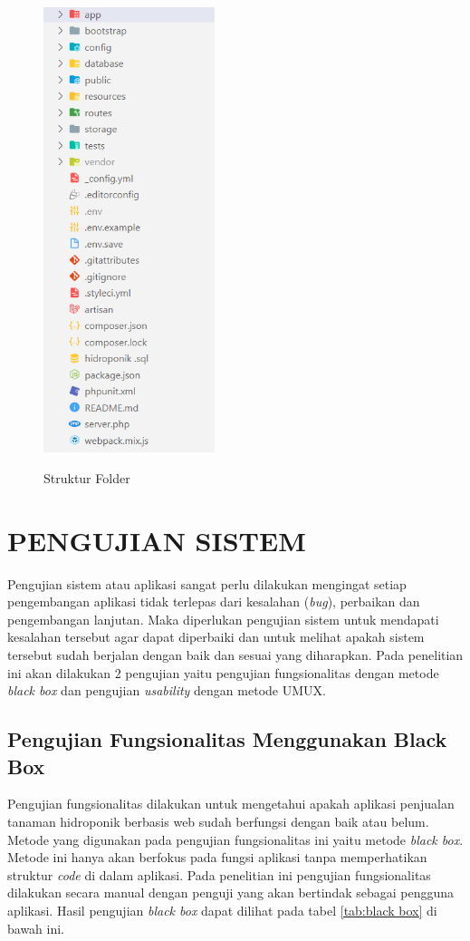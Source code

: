 \begin{enumerate}
	\begin{figure}[H]
		\centering
		{\includegraphics [width = 5cm, height= 13cm]{gambar/struktur folder}}
		\caption{Struktur Folder}
		\label{struktur folder}
	\end{figure}
\end{enumerate}

\section{\uppercase{Pengujian Sistem}}
Pengujian sistem atau aplikasi sangat perlu dilakukan mengingat setiap pengembangan aplikasi tidak terlepas dari kesalahan (\textit{bug}), perbaikan dan pengembangan lanjutan. Maka diperlukan pengujian sistem untuk mendapati kesalahan tersebut agar dapat diperbaiki dan untuk melihat apakah sistem tersebut sudah berjalan dengan baik dan sesuai yang diharapkan. Pada penelitian ini akan dilakukan 2 pengujian yaitu pengujian fungsionalitas dengan metode \textit{black box} dan pengujian \textit{usability} dengan metode UMUX.

\subsection{Pengujian Fungsionalitas Menggunakan Black Box}
Pengujian fungsionalitas dilakukan untuk mengetahui apakah aplikasi penjualan tanaman hidroponik berbasis web sudah berfungsi dengan baik atau belum. Metode yang digunakan pada pengujian fungsionalitas ini yaitu metode \textit{black box}. Metode ini hanya akan berfokus pada fungsi aplikasi tanpa memperhatikan struktur \textit{code} di dalam aplikasi. Pada penelitian ini pengujian fungsionalitas dilakukan secara manual dengan penguji yang akan bertindak sebagai pengguna aplikasi. Hasil pengujian \textit{black box} dapat dilihat pada tabel \ref*{tab:black box} di bawah ini.

